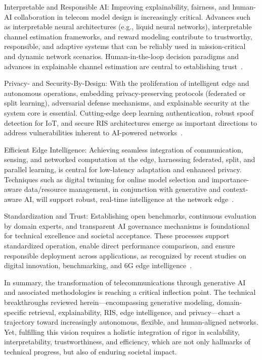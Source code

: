 \documentclass[sigconf]{acmart}
\begin{document}
Interpretable and Responsible AI: Improving explainability, fairness, and human-AI collaboration in telecom model design is increasingly critical. Advances such as interpretable neural architectures (e.g., liquid neural networks), interpretable channel estimation frameworks, and reward modeling contribute to trustworthy, responsible, and adaptive systems that can be reliably used in mission-critical and dynamic network scenarios. Human-in-the-loop decision paradigms and advances in explainable channel estimation are central to establishing trust~\cite{ref43,ref44,ref45,ref49,ref35,ref38}.

Privacy- and Security-By-Design: With the proliferation of intelligent edge and autonomous operations, embedding privacy-preserving protocols (federated or split learning), adversarial defense mechanisms, and explainable security at the system core is essential. Cutting-edge deep learning authentication, robust spoof detection for IoT, and secure RIS architectures emerge as important directions to address vulnerabilities inherent to AI-powered networks~\cite{ref24,ref25,ref35,ref38,ref39}.

Efficient Edge Intelligence: Achieving seamless integration of communication, sensing, and networked computation at the edge, harnessing federated, split, and parallel learning, is central for low-latency adaptation and enhanced privacy. Techniques such as digital twinning for online model selection and importance-aware data/resource management, in conjunction with generative and context-aware AI, will support robust, real-time intelligence at the network edge~\cite{ref36,ref37,ref38,ref39,ref42,ref49}.

Standardization and Trust: Establishing open benchmarks, continuous evaluation by domain experts, and transparent AI governance mechanisms is foundational for technical excellence and societal acceptance. These processes support standardized operation, enable direct performance comparison, and ensure responsible deployment across applications, as recognized by recent studies on digital innovation, benchmarking, and 6G edge intelligence~\cite{ref13,ref19,ref28,ref42,ref49}.

In summary, the transformation of telecommunications through generative AI and associated methodologies is reaching a critical inflection point. The technical breakthroughs reviewed herein—encompassing generative modeling, domain-specific retrieval, explainability, RIS, edge intelligence, and privacy—chart a trajectory toward increasingly autonomous, flexible, and human-aligned networks. Yet, fulfilling this vision requires a holistic integration of rigor in scalability, interpretability, trustworthiness, and efficiency, which are not only hallmarks of technical progress, but also of enduring societal impact.






\end{document}

